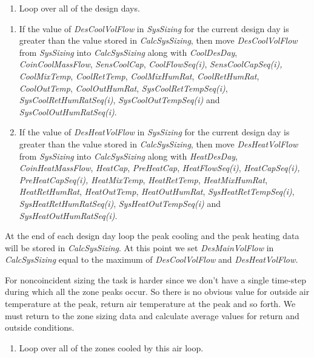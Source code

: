 \begin{enumerate}
\def\labelenumi{(\alph{enumi})}
\item Loop over all of the design days.
\end{enumerate}

\begin{enumerate}
\def\labelenumi{(\roman{enumi})}
\item If the value of \emph{DesCoolVolFlow} in \emph{SysSizing} for the current design day is greater than the value stored in \emph{CalcSysSizing}, then move \emph{DesCoolVolFlow} from \emph{SysSizing} into \emph{CalcSysSizing} along with \emph{CoolDesDay}, \emph{CoinCoolMassFlow}, \emph{SensCoolCap}, \emph{CoolFlowSeq(i)}, \emph{SensCoolCapSeq(i),} \emph{CoolMixTemp}, \emph{CoolRetTemp}, \emph{CoolMixHumRat}, \emph{CoolRetHumRat}, \emph{CoolOutTemp}, \emph{CoolOutHumRat}, \emph{SysCoolRetTempSeq(i)}, \emph{SysCoolRetHumRatSeq(i)}, \emph{SysCoolOutTempSeq(i)} and \emph{SysCoolOutHumRatSeq(i)}.

\item If the value of \emph{DesHeatVolFlow} in \emph{SysSizing} for the current design day is greater than the value stored in \emph{CalcSysSizing}, then move \emph{DesHeatVolFlow} from \emph{SysSizing} into \emph{CalcSysSizing} along with \emph{HeatDesDay}, \emph{CoinHeatMassFlow}, \emph{HeatCap}, \emph{PreHeatCap}, \emph{HeatFlowSeq(i)}, \emph{HeatCapSeq(i),} \emph{PreHeatCapSeq(i), HeatMixTemp}, \emph{HeatRetTemp}, \emph{HeatMixHumRat}, \emph{HeatRetHumRat}, \emph{HeatOutTemp}, \emph{HeatOutHumRat}, \emph{SysHeatRetTempSeq(i)}, \emph{SysHeatRetHumRatSeq(i)}, \emph{SysHeatOutTempSeq(i)} and \emph{SysHeatOutHumRatSeq(i)}.

\end{enumerate}

At the end of each design day loop the peak cooling and the peak heating data will be stored in \emph{CalcSysSizing}. At this point we set \emph{DesMainVolFlow} in \emph{CalcSysSizing} equal to the maximum of \emph{DesCoolVolFlow} and \emph{DesHeatVolFlow.}

For noncoincident sizing the task is harder since we don't have a single time-step during which all the zone peaks occur. So there is no obvious value for outside air temperature at the peak, return air temperature at the peak and so forth. We must return to the zone sizing data and calculate average values for return and outside conditions.

\begin{enumerate}
\def\labelenumi{(\alph{enumi})}
\setcounter{enumi}{1}
\item Loop over all of the zones cooled by this air loop.
\end{enumerate}

